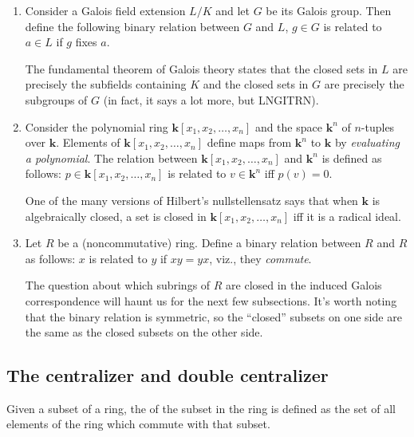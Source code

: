 \documentclass[a4paper]{amsart}
\newcommand{\field}{\mathbf{k}}
\begin{document}
\begin{enumerate}

\item Consider a Galois field extension $L/K$ and let $G$ be its
  Galois group. Then define the following binary relation between $G$
  and $L$, $g \in G$ is related to $a \in L$ if $g$ fixes $a$.

  The fundamental theorem of Galois theory states that the closed sets
  in $L$ are precisely the subfields containing $K$ and the closed
  sets in $G$ are precisely the subgroups of $G$ (in fact, it says a
  lot more, but LNGITRN).

\item Consider the polynomial ring $\field[x_1,x_2,\ldots,x_n]$ and
  the space $\field^n$ of $n$-tuples over $\field$. Elements of
  $\field[x_1,x_2,\ldots,x_n]$ define maps from $\field^n$ to $\field$
  by {\em evaluating a polynomial}. The relation between
  $\field[x_1,x_2,\ldots,x_n]$ and $\field^n$ is defined as follows:
  $p \in \field[x_1,x_2,\ldots,x_n]$ is related to $v \in \field^n$
  iff $p(v) = 0$.

  One of the many versions of Hilbert's nullstellensatz says that when
  $\field$ is algebraically closed, a set is closed in
  $\field[x_1,x_2,\ldots,x_n]$ iff it is a radical
    ideal.

\item Let $R$ be a (noncommutative) ring. Define a binary relation
  between $R$ and $R$ as follows: $x$ is related to $y$ if $xy = yx$,
  viz.,  they {\em commute}.

  The question about which subrings of $R$ are closed in the induced
  Galois correspondence will haunt us for the next few
  subsections. It's worth noting that the binary relation is
  symmetric, so the ``closed'' subsets on one side are the same as the
  closed subsets on the other side.
\end{enumerate}

\subsection{The centralizer and double centralizer}

\begin{definer}
  Given a subset of a ring, the  of the subset
  in the ring is defined as the set of all elements of the ring which
  commute with that subset.
\end{definer}
\end{document}
